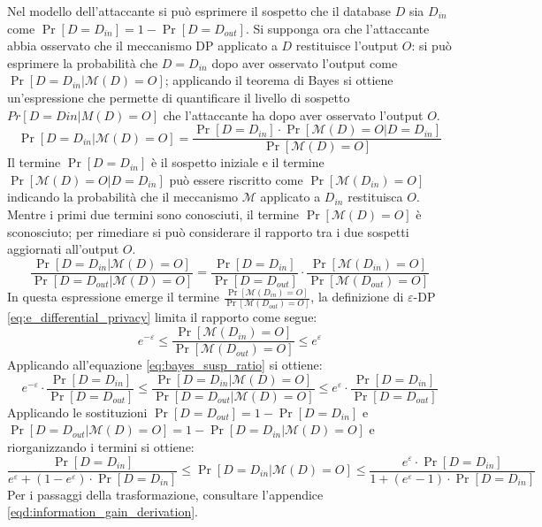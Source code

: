 Nel modello dell'attaccante si può esprimere il sospetto che il database $D$ sia $D_{in}$ come $\Pr[D = D_{in}] = 1 - \Pr[D = D_{out}]$. Si supponga ora che l'attaccante abbia osservato che il meccanismo DP applicato a $D$ restituisce l'output $O$: si può esprimere la probabilità che $D = D_{in}$ dopo aver osservato l'output come $\Pr[D = D_{in} | \mathcal{M}(D) = O]$; applicando il teorema di Bayes si ottiene un'espressione che permette di quantificare il livello di sospetto $Pr[D = Din|M(D) = O]$ che l'attaccante ha dopo aver osservato l'output $O$.
\begin{equation}
\label{eq:bayes_susp}
    \Pr[D = D_{in} | \mathcal{M}(D) = O] = \frac{\Pr[D = D_{in}] \cdot \Pr[\mathcal{M}(D) = O | D = D_{in}]}{\Pr[\mathcal{M}(D) = O]}
\end{equation}
Il termine $\Pr[D = D_{in}]$ è il sospetto iniziale e il termine $\Pr[\mathcal{M}(D) = O | D = D_{in}]$ può essere riscritto come $\Pr[\mathcal{M}(D_{in}) = O]$ indicando la probabilità che il meccanismo $\mathcal{M}$ applicato a $D_{in}$ restituisca $O$. Mentre i primi due termini sono conosciuti, il termine $\Pr[\mathcal{M}(D) = O]$ è sconosciuto; per rimediare si può considerare il rapporto tra i due sospetti aggiornati all'output $O$.
\begin{equation}
\label{eq:bayes_susp_ratio}
    \frac{\Pr[D = D_{in} | \mathcal{M}(D) = O]}{\Pr[D = D_{out} | \mathcal{M}(D) = O]} = \frac{\Pr[D = D_{in}]}{\Pr[D = D_{out}]} \cdot \frac{\Pr[\mathcal{M}(D_{in}) = O]}{\Pr[\mathcal{M}(D_{out}) = O]}
\end{equation}
In questa espressione emerge il termine $\frac{\Pr[\mathcal{M}(D_{in}) = O]}{\Pr[\mathcal{M}(D_{out}) = O]}$, la definizione di $\varepsilon$-DP \eqref{eq:e_differential_privacy} limita il rapporto come segue:
\begin{equation}
\label{eq:e_dp_bounds}
    e^{-\varepsilon} \le \frac{\Pr[\mathcal{M}(D_{in}) = O]}{\Pr[\mathcal{M}(D_{out}) = O]} \le e^{\varepsilon}
\end{equation}
Applicando all'equazione \eqref{eq:bayes_susp_ratio} si ottiene:
\begin{equation}
\label{eq:mid_information_gain}
    e^{-\varepsilon} \cdot \frac{\Pr[D = D_{in}]}{\Pr[D = D_{out}]} \le \frac{\Pr[D = D_{in} | \mathcal{M}(D) = O]}{\Pr[D = D_{out} | \mathcal{M}(D) = O]} \le e^{\varepsilon} \cdot \frac{\Pr[D = D_{in}]}{\Pr[D = D_{out}]} 
\end{equation}
Applicando le sostituzioni $\Pr[D = D_{out}] = 1 - \Pr[D = D_{in}]$ e $\Pr[D = D_{out} | \mathcal{M}(D) = O] = 1 - \Pr[D = D_{in} | \mathcal{M}(D) = O]$ e riorganizzando i termini si ottiene:
\begin{equation}
\label{eq:information_gain}
    \frac{\Pr[D = D_{in}]}{e^\varepsilon + (1 - e^\varepsilon) \cdot \Pr[D = D_{in}]} \le \Pr[D = D_{in} | \mathcal{M}(D) = O] \le \frac{e^\varepsilon \cdot \Pr[D = D_{in}]}{1 + (e^\varepsilon - 1) \cdot \Pr[D = D_{in}]}
\end{equation}
Per i passaggi della trasformazione, consultare l'appendice \ref{eqd:information_gain_derivation}.

